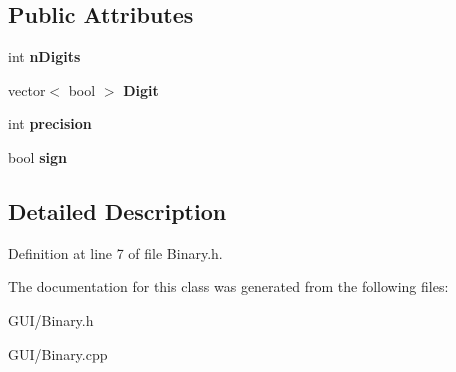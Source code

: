 \subsection*{Public Attributes}
\begin{DoxyCompactItemize}
\item 
\mbox{\label{class_c_binary_ac7fbacb391c67783daca12eecc2c996c}} 
int {\bfseries n\+Digits}
\item 
\mbox{\label{class_c_binary_a7c6b86217c457c0954c0d95446bd31c5}} 
vector$<$ bool $>$ {\bfseries Digit}
\item 
\mbox{\label{class_c_binary_a78867a9363dc4ad1fa98ce32f41f7880}} 
int {\bfseries precision}
\item 
\mbox{\label{class_c_binary_aabcf53ce73b0c273b1630b4af8b5628c}} 
bool {\bfseries sign}
\end{DoxyCompactItemize}


\subsection{Detailed Description}


Definition at line 7 of file Binary.\+h.



The documentation for this class was generated from the following files\+:\begin{DoxyCompactItemize}
\item 
G\+U\+I/Binary.\+h\item 
G\+U\+I/Binary.\+cpp\end{DoxyCompactItemize}
